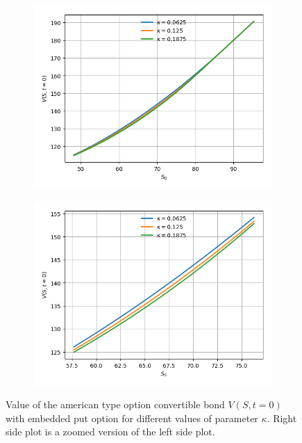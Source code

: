 \documentclass{article}
\begin{document}
\begin{figure}[!bh]
\begin{minipage}{.5\textwidth}
  \centering
  \begin{subfigure}{\textwidth}
      \includegraphics[width=\textwidth,center]{../images/complete_american_varying_s_varying_k.png}
  \end{subfigure}
\end{minipage}
\begin{minipage}{.5\textwidth}
  \centering
  \begin{subfigure}{\textwidth}
      \includegraphics[width=\textwidth,center]{../images/american_varying_s_varying_k.png}
  \end{subfigure}
\end{minipage}
\caption{Value of the american type option convertible bond $V(S,t=0)$ with embedded put option for different values of parameter $\kappa$. Right side plot is a zoomed version of the left side plot.}
\label{fig:american_varying_s_varying_k}
\end{figure}
\end{document}
